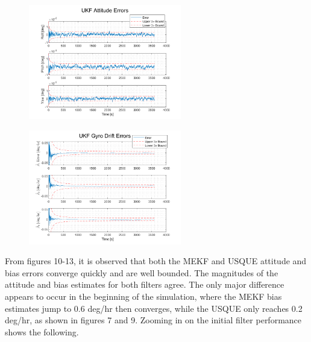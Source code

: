\documentclass[12pt]{report}
\begin{document}
\begin{figure}[h!]
	\centering
	\begin{minipage}{.5\textwidth}
		\centering
		\includegraphics[height=5cm, keepaspectratio]{ukfAttErr.png}
		\label{fig:ex1}
	\end{minipage}%
	\begin{minipage}{.5\textwidth}
		\centering
		\includegraphics[height=5cm, keepaspectratio]{ukfBiasErr.png}
		\label{fig:ex2}
	\end{minipage}
\end{figure}
\newpage

\noindent From figures 10-13, it is observed that both the MEKF and USQUE attitude and bias errors converge quickly and are well bounded. The magnitudes of the attitude and bias estimates for both filters agree. The only major difference appears to occur in the beginning of the simulation, where the MEKF bias estimates jump to 0.6 deg/hr then converges, while the USQUE only reaches 0.2 deg/hr, as shown in figures 7 and 9. Zooming in on the initial filter performance shows the following.
\end{document}
